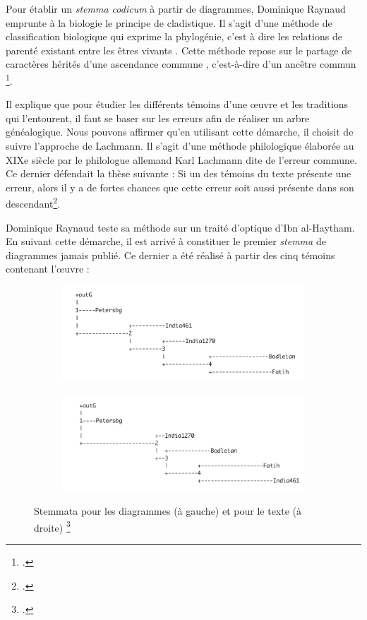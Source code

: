 Pour établir un \textit{stemma codicum} à partir de diagrammes, Dominique Raynaud emprunte à la biologie le principe de cladistique. Il s'agit \og d'une méthode de classification biologique qui exprime la phylogénie, c'est à dire les relations de parenté existant entre les êtres vivants \fg. Cette méthode \og repose sur le partage de caractères hérités d'une ascendance commune \fg, c'est-à-dire d'un \og ancêtre commun \fg \footcite{tassyCLADISTIQUE2012}.

Il explique que pour étudier les différents témoins d'une œuvre et les traditions qui l'entourent, il faut se baser sur les erreurs afin de réaliser un arbre généalogique. Nous pouvons affirmer qu'en utilisant cette démarche, il choisit de suivre l'approche de Lachmann. Il s'agit d'une méthode philologique élaborée au XIXe siècle par le philologue allemand Karl Lachmann dite de l'erreur commune. Ce dernier défendait la thèse suivante : Si un des témoins du texte présente une erreur, alors il y a de fortes chances que cette erreur soit aussi présente dans son descendant\footcite{pouliquenUsingLatticesReconstructing}.

Dominique Raynaud teste sa méthode sur un traité d'optique d'Ibn al-Haytham. En suivant cette démarche, il est arrivé à constituer le premier \textit{stemma} de diagrammes jamais publié. Ce dernier a été réalisé à partir des cinq témoins contenant l'œuvre :


\begin{figure}[h]
	\centering
	\begin{subfigure}{0.48\linewidth}
		\centering
		\includegraphics[width=\linewidth]{images/diagram_stemma}
	\end{subfigure}
	\hfill
	\begin{subfigure}{0.48\linewidth}
		\centering
		\includegraphics[width=\linewidth]{images/text_stemma}
	\end{subfigure}
	\caption{Stemmata pour les diagrammes (à gauche) et pour le texte (à droite) \footcite{raynaudBuildingStemmaCodicum2014}}
	\label{fig:stemma}
\end{figure}


